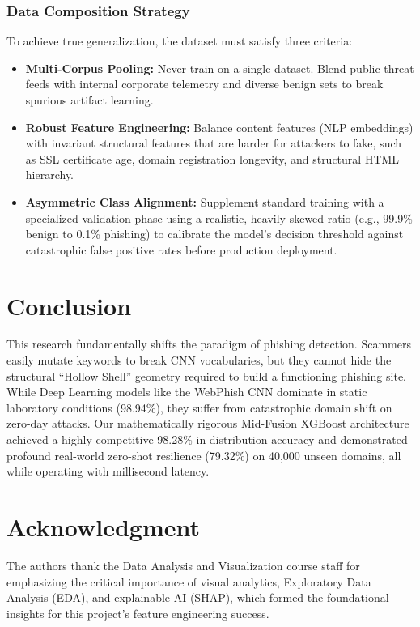 \documentclass[conference]{IEEEtran}
\begin{document}
\subsubsection{Data Composition Strategy}
To achieve true generalization, the dataset must satisfy three criteria:
\begin{itemize}
    \item \textbf{Multi-Corpus Pooling:} Never train on a single dataset. Blend public threat feeds with internal corporate telemetry and diverse benign sets to break spurious artifact learning.
    \item \textbf{Robust Feature Engineering:} Balance content features (NLP embeddings) with invariant structural features that are harder for attackers to fake, such as SSL certificate age, domain registration longevity, and structural HTML hierarchy.
    \item \textbf{Asymmetric Class Alignment:} Supplement standard training with a specialized validation phase using a realistic, heavily skewed ratio (e.g., 99.9\% benign to 0.1\% phishing) to calibrate the model's decision threshold against catastrophic false positive rates before production deployment.
\end{itemize}

\section{Conclusion}
This research fundamentally shifts the paradigm of phishing detection. Scammers easily mutate keywords to break CNN vocabularies, but they cannot hide the structural ``Hollow Shell'' geometry required to build a functioning phishing site. While Deep Learning models like the WebPhish CNN dominate in static laboratory conditions (98.94\%), they suffer from catastrophic domain shift on zero-day attacks. Our mathematically rigorous Mid-Fusion XGBoost architecture achieved a highly competitive 98.28\% in-distribution accuracy and demonstrated profound real-world zero-shot resilience (79.32\%) on 40,000 unseen domains, all while operating with millisecond latency.

\section*{Acknowledgment}
The authors thank the Data Analysis and Visualization course staff for emphasizing the critical importance of visual analytics, Exploratory Data Analysis (EDA), and explainable AI (SHAP), which formed the foundational insights for this project's feature engineering success.



\end{document}
